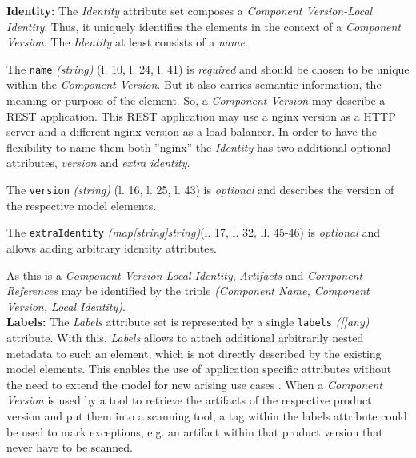 \textbf{Identity:} The \emph{Identity} attribute set composes a \emph{Component Version-Local Identity}. Thus, it uniquely identifies the elements in the context of a \emph{Component Version}. The \emph{Identity} at least consists of a \emph{name}.\par 
The \lstinline|name| \emph{(string)}  (l. 10, l. 24, l. 41) is \emph{required} and should be chosen to be unique within the \emph{Component Version}. But it also carries semantic information, the meaning or purpose of the element. So, a \emph{Component Version} may describe a REST application. This REST application may use a nginx version as a HTTP server and a different nginx version as a load balancer. In order to have the flexibility to name them both ''nginx'' the \emph{Identity} has two additional optional attributes, \emph{version} and \emph{extra identity}.\par
The \lstinline|version| \emph{(string)} (l. 16, l. 25, l. 43) is \emph{optional} and describes the version of the respective model elements.\par
The \lstinline|extraIdentity| \emph{(map[string]string)}(l. 17, l. 32, ll. 45-46) is \emph{optional} and allows adding arbitrary identity attributes.\par
As this is a \emph{Component-Version-Local Identity}, \emph{Artifacts} and \emph{Component References} may be identified by the triple \emph{({Component Name}, {Component Version}, {Local Identity})}.\\

\textbf{Labels:} The \emph{Labels} attribute set is represented by a single \lstinline|labels| \emph{([]any)} attribute. With this, \emph{Labels} allows to attach additional arbitrarily nested metadata to such an element, which is not directly described by the existing model elements. This enables the use of application specific attributes without the need to extend the model for new arising use cases \cite{OCMSpec}. When a \emph{Component Version} is used by a tool to retrieve the artifacts of the respective product version and put them into a scanning tool, a tag within the labels attribute could be used to mark exceptions, e.g. an artifact within that product version that never have to be scanned.\\

